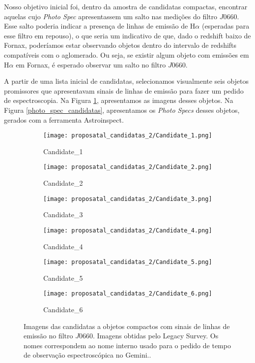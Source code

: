 Nosso objetivo inicial foi, dentro da amostra de candidatas compactas, encontrar aquelas cujo \textit{Photo Spec} apresentassem um salto nas medições do filtro $J0660$. Esse salto poderia indicar a presença de linhas de emissão de H$\alpha$ (esperadas para esse filtro em repouso), o que seria um indicativo de que, dado o redshift baixo de Fornax, poderíamos estar observando objetos dentro do intervalo de redshifts compatíveis com o aglomerado. Ou seja, se existir algum objeto com emissões em H$\alpha$ em Fornax, é esperado observar um salto no filtro $J0660$.

A partir de uma lista inicial de candidatas, selecionamos visualmente seis objetos promissores que apresentavam sinais de linhas de emissão para fazer um pedido de espectroscopia. Na Figura \ref{candidatas_espectroscopia_2_img}, apresentamos as imagens desses objetos. Na Figura \ref{photo_spec_candidatas}, apresentamos os \textit{Photo Specs} desses objetos, gerados com a ferramenta Astroinspect.


\begin{figure}[!ht]
    \centering
    \captionsetup{justification=centering}
    \begin{subfigure}[b]{0.25\textwidth}
        \texttt{[image: proposatal\_candidatas\_2/Candidate\_1.png]}
        \caption{Candidate\_1}
    \end{subfigure}
    \begin{subfigure}[b]{0.25\textwidth}
        \texttt{[image: proposatal\_candidatas\_2/Candidate\_2.png]}
        \caption{Candidate\_2}
    \end{subfigure}
    \begin{subfigure}[b]{0.25\textwidth}
        \texttt{[image: proposatal\_candidatas\_2/Candidate\_3.png]}
        \caption{Candidate\_3}
    \end{subfigure}
    \begin{subfigure}[b]{0.25\textwidth}
        \texttt{[image: proposatal\_candidatas\_2/Candidate\_4.png]}
        \caption{Candidate\_4}
    \end{subfigure}
    \begin{subfigure}[b]{0.25\textwidth}
        \texttt{[image: proposatal\_candidatas\_2/Candidate\_5.png]}
        \caption{Candidate\_5}
    \end{subfigure}
    \begin{subfigure}[b]{0.25\textwidth}
        \texttt{[image: proposatal\_candidatas\_2/Candidate\_6.png]}
        \caption{Candidate\_6}
    \end{subfigure}
    \caption{Imagens das candidatas a objetos compactos com sinais de linhas de emissão no filtro $J0660$. Imagens obtidas pelo Legacy Survey. Os nomes correspondem ao nome interno usado para o pedido de tempo de observação espectroscópica no Gemini..}
    \label{candidatas_espectroscopia_2_img}
\end{figure}

